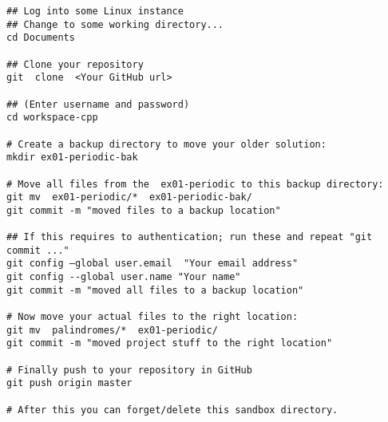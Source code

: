 \documentclass[11pt,a4paper]{article}
\begin{document}
\begin{Verbatim}[frame=single]
## Log into some Linux instance
## Change to some working directory...
cd Documents

## Clone your repository
git  clone  <Your GitHub url>

## (Enter username and password)
cd workspace-cpp

# Create a backup directory to move your older solution:
mkdir ex01-periodic-bak

# Move all files from the  ex01-periodic to this backup directory:
git mv  ex01-periodic/*  ex01-periodic-bak/
git commit -m "moved files to a backup location"

## If this requires to authentication; run these and repeat "git commit ..."
git config –global user.email  "Your email address"
git config --global user.name "Your name"
git commit -m "moved all files to a backup location"

# Now move your actual files to the right location:
git mv  palindromes/*  ex01-periodic/
git commit -m "moved project stuff to the right location"

# Finally push to your repository in GitHub
git push origin master

# After this you can forget/delete this sandbox directory. 
\end{Verbatim}
\end{document}
